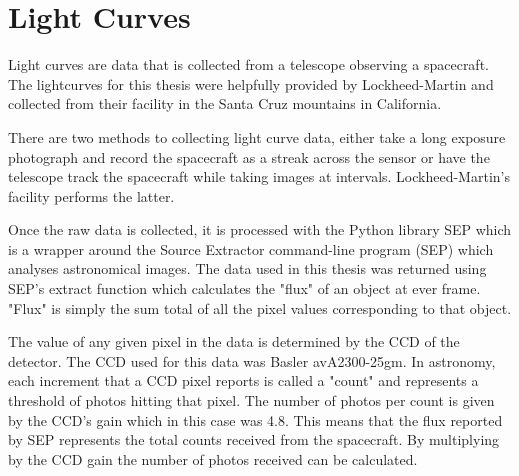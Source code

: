 \section{Light Curves}

Light curves are data that is collected from a telescope observing a spacecraft. The lightcurves for this thesis were helpfully provided by Lockheed-Martin and collected from their facility in the Santa Cruz mountains in California.

There are two methods to collecting light curve data, either take a long exposure photograph and record the spacecraft as a streak across the sensor or have the telescope track the spacecraft while taking images at intervals. Lockheed-Martin's facility performs the latter. 

Once the raw data is collected, it is processed with the Python library SEP which is a wrapper around the Source Extractor command-line program (SEP) which analyses astronomical images. The data used in this thesis was returned using SEP's extract function which calculates the "flux" of an object at ever frame. "Flux" is simply the sum total of all the pixel values corresponding to that object.

The value of any given pixel in the data is determined by the CCD of the detector. The CCD used for this data was Basler avA2300-25gm. In astronomy, each increment that a CCD pixel reports is called a "count" and represents a threshold of photos hitting that pixel. The number of photos per count is given by the CCD's gain which in this case was 4.8. This means that the flux reported by SEP represents the total counts received from the spacecraft. By multiplying by the CCD gain the number of photos received can be calculated.
